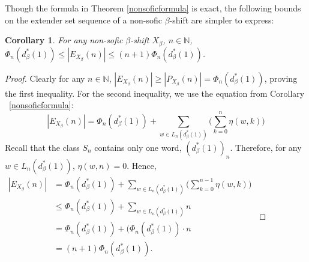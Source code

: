 \documentclass{amsart}
\newtheorem{corollary}[theorem]{Corollary}
\theoremstyle{definition}
\numberwithin{equation}{section}
\begin{document}


Though the formula in Theorem \ref{nonsoficformula} is exact, the following bounds on the extender set sequence of a non-sofic $\beta$-shift are simpler to express:

\begin{corollary}\label{ESBounds}
For any non-sofic $\beta$-shift $X_\beta$, $n \in \mathbb{N}$, $\Phi_n(d_\beta^*(1)) \leq |E_{X_\beta}(n)| \leq (n+1)\Phi_n(d_\beta^*(1))$.
\end{corollary}

\begin{proof}
Clearly for any $n \in \mathbb{N}$, $|E_{X_\beta}(n)| \geq |P_{X_\beta}(n)| = \Phi_n(d_\beta^*(1))$, proving the first inequality. For the second inequality, we use the equation from Corollary ~\ref{nonsoficformula}: 
$$|E_{X_\beta}(n)| = \displaystyle \Phi_n(d_\beta^*(1)) + \sum_{w \in L_n(d_\beta^*(1))} \Big( \sum_{k=0}^n \eta (w,k) \Big)$$
Recall that the class $S_n$ contains only one word, $(d_\beta^*(1))_n$. Therefore, for any $w \in L_n(d_\beta^*(1))$, $\eta(w,n) = 0$. Hence, \newline
$\begin{aligned}
|E_{X_\beta}(n)| &= \displaystyle \Phi_n(d_\beta^*(1)) + \sum_{w \in L_n(d_\beta^*(1))} \Big( \sum_{k=0}^{n-1} \eta (w,k) \Big)\\
&\leq \displaystyle \Phi_n(d_\beta^*(1)) + \sum_{w \in L_n(d_\beta^*(1))} n\\
&= \displaystyle \Phi_n(d_\beta^*(1)) + (\Phi_n(d_\beta^*(1))\cdot n\\
&= (n+1)\Phi_n(d_\beta^*(1)).
\end{aligned}$ \newline

\end{proof}
\end{document}
